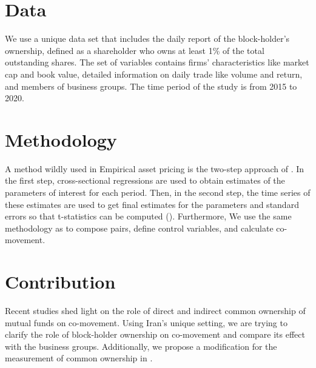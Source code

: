 \documentclass[12pt, a4paper]{article}
\begin{document}
\section*{Data}
We use a unique data set that includes the daily report of the block-holder's ownership, defined as a shareholder who owns at least 1\% of the total outstanding shares. The set of variables contains firms' characteristics like market cap and book value, detailed information on daily trade like volume and return, and members of business groups. The time period of the study is from 2015 to 2020.

\section*{Methodology}

A method wildly used in Empirical asset pricing is the two-step approach of \cite{FamaMacBeth}. In the first step, cross-sectional regressions
are used to obtain estimates of the parameters of interest for each period. Then, in the second step, the time series of these estimates are used to get final estimates for the parameters and standard errors so that t-statistics can be computed (\cite{skoulakis2008panel}). Furthermore, We use the same methodology as  \cite{AntonPolk} to compose pairs, define control variables, and calculate co-movement. 


\section*{Contribution}

Recent studies shed light on the role of direct and indirect common ownership of mutual funds on co-movement. Using Iran's unique setting, we are trying to clarify the role of block-holder ownership on co-movement and compare its effect with the business groups. Additionally, we propose a modification for the measurement of common ownership in \cite{AntonPolk}.



	












	


	
\newpage
	{
	\footnotesize
	
	
}
\end{document}
